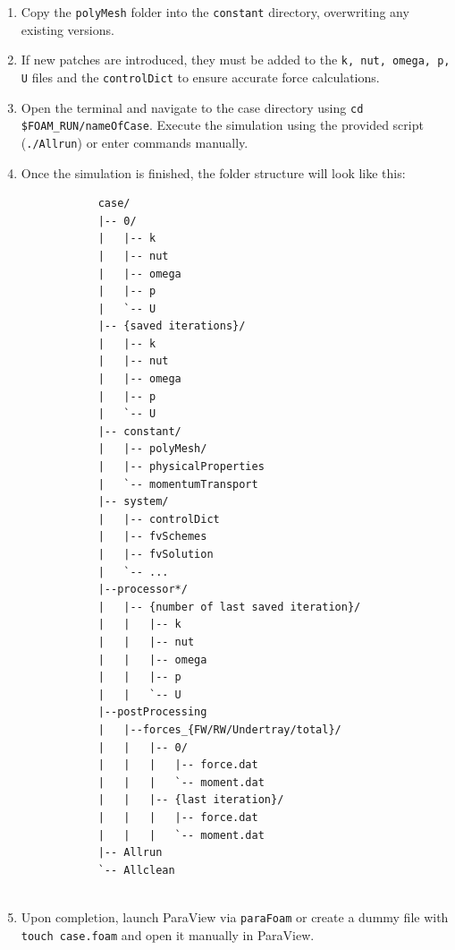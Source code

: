 \documentclass[a4paper]{article}
\begin{document}
\begin{enumerate}
\begin{verbatim}
		\end{verbatim}
		\item Copy the \texttt{polyMesh} folder into the \texttt{constant} directory, overwriting any existing versions.
		\item If new patches are introduced, they must be added to the \texttt{k, nut, omega, p, U} files and the \texttt{controlDict} to ensure accurate force calculations.
		\item Open the terminal and navigate to the case directory using \texttt{cd \$FOAM\_RUN/nameOfCase}.
		Execute the simulation using the provided script (\texttt{./Allrun}) or enter commands manually.
		\item Once the simulation is finished, the folder structure will look like this:
		\begin{verbatim}
			case/
			|-- 0/
			|   |-- k
			|   |-- nut
			|   |-- omega
			|   |-- p
			|   `-- U
			|-- {saved iterations}/
			|   |-- k
			|   |-- nut
			|   |-- omega
			|   |-- p
			|   `-- U
			|-- constant/
			|   |-- polyMesh/
			|   |-- physicalProperties
			|   `-- momentumTransport
			|-- system/
			|   |-- controlDict
			|   |-- fvSchemes
			|   |-- fvSolution
			|   `-- ...
			|--processor*/
			|   |-- {number of last saved iteration}/
			|   |   |-- k
			|   |   |-- nut
			|   |   |-- omega
			|   |   |-- p
			|   |   `-- U
			|--postProcessing
			|   |--forces_{FW/RW/Undertray/total}/
			|   |   |-- 0/
			|   |   |   |-- force.dat
			|   |   |   `-- moment.dat
			|   |   |-- {last iteration}/
			|   |   |   |-- force.dat
			|   |   |   `-- moment.dat
			|-- Allrun
			`-- Allclean
			
		\end{verbatim}
		\item Upon completion, launch ParaView via \texttt{paraFoam} or create a dummy file with \texttt{touch case.foam} and open it manually in ParaView.
		
	\end{enumerate}
	\newpage
	
\end{document}
